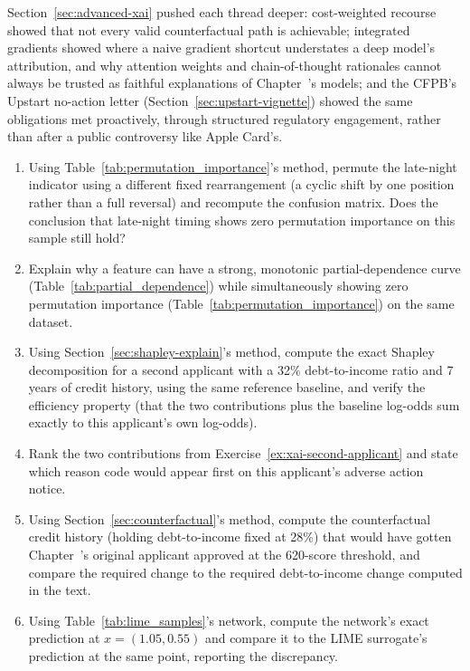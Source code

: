 \documentclass[../ai_in_finance]{subfiles}
\begin{document}
Section~\ref{sec:advanced-xai} pushed each thread deeper: cost-weighted recourse showed that not every valid counterfactual path is achievable; integrated gradients showed where a naive gradient shortcut understates a deep model's attribution, and why attention weights and chain-of-thought rationales cannot always be trusted as faithful explanations of Chapter~'s models; and the CFPB's Upstart no-action letter (Section~\ref{sec:upstart-vignette}) showed the same obligations met proactively, through structured regulatory engagement, rather than after a public controversy like Apple Card's.


\begin{enumerate}[exercises]
    \item Using Table~\ref{tab:permutation_importance}'s method, permute the late-night indicator using a different fixed rearrangement (a cyclic shift by one position rather than a full reversal) and recompute the confusion matrix. Does the conclusion that late-night timing shows zero permutation importance on this sample still hold?
    \item Explain why a feature can have a strong, monotonic partial-dependence curve (Table~\ref{tab:partial_dependence}) while simultaneously showing zero permutation importance (Table~\ref{tab:permutation_importance}) on the same dataset.
    \item\label{ex:xai-second-applicant} Using Section~\ref{sec:shapley-explain}'s method, compute the exact Shapley decomposition for a second applicant with a 32\% debt-to-income ratio and 7 years of credit history, using the same reference baseline, and verify the efficiency property (that the two contributions plus the baseline log-odds sum exactly to this applicant's own log-odds).
    \item Rank the two contributions from Exercise~\ref{ex:xai-second-applicant} and state which reason code would appear first on this applicant's adverse action notice.
    \item Using Section~\ref{sec:counterfactual}'s method, compute the counterfactual credit history (holding debt-to-income fixed at 28\%) that would have gotten Chapter~'s original applicant approved at the 620-score threshold, and compare the required change to the required debt-to-income change computed in the text.
    \item Using Table~\ref{tab:lime_samples}'s network, compute the network's exact prediction at $x = (1.05, 0.55)$ and compare it to the LIME surrogate's prediction at the same point, reporting the discrepancy.

\end{enumerate}
\end{document}
